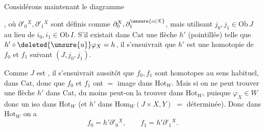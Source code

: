 
Considérons maintenant le diagramme 


, où $\partial'_0{}^X,\partial'_1{}^X$ sont définis comme $\partial_0^X,\partial_1^{\unsure{\alpha|X}}$, mais utilisant $j_0,j_1\in\mathrm{Ob}\,J$ au lieu de $i_0,i_1\in\mathrm{Ob}\,I$. S'il existait dans $\mathrm{Cat}$ une flèche $h'$ (pointillée) telle que $h'\circ\deleted{\unsure{u}}\varphi_X=h$, il s'ensuivrait que  $h'$ est une homotopie de $f_0$ et $f_1$ suivant $(J,j_0,j_1)$.

Comme $J$ est , il s'ensuivrait aussitôt que $f_0,f_1$ sont homotopes au sens habituel, dans $\mathrm{Cat}$, donc  que $f_0$ et $f_1$ ont $=$ image dans $\mathrm{Hot}_W$. Mais si on ne peut trouver une flèche $h'$ dans $\mathrm{Cat}$, du moins peut-on la trouver dans $\mathrm{Hot}_W$, puisque $\varphi_X\in W$ donc un iso dans $\mathrm{Hot}_W$ (et $h'$ dans $\mathrm{Hom}_W(J\times X,Y)$  $=$  déterminée). Donc dans $\mathrm{Hot}_W$ on a 
\[
 f_0=h'\partial'_0{}^X,\qquad f_1=h'\partial'_1{}^X.
\]
